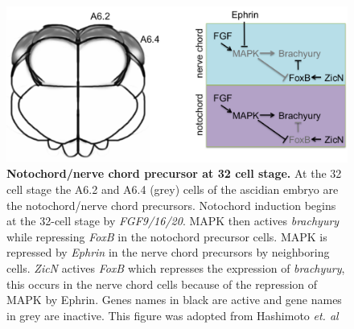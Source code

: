 \begin{figure}[thbp]
\centering
\includegraphics[scale=0.5]{figures/32_bra.png}
\caption{\textbf{Notochord/nerve chord precursor at 32 cell stage.} At the 32 cell stage the A6.2 and A6.4 (grey) cells of the ascidian embryo are the notochord/nerve chord precursors. Notochord induction begins at the 32-cell stage by \textit{FGF9/16/20}. MAPK then actives \textit{brachyury} while repressing \textit{FoxB} in the notochord precursor cells. MAPK is repressed by \textit{Ephrin} in the nerve chord precursors by neighboring cells. \textit{ZicN} actives \textit{FoxB} which represses the expression of \textit{brachyury}, this occurs in the nerve chord cells because of the repression of MAPK by Ephrin. Genes names in black are active and gene names in grey are inactive. This figure was adopted from Hashimoto \textit{et. al} \cite{hashimoto_transcription_2011} }
\label{fig:32noto_cells}
\end{figure}

